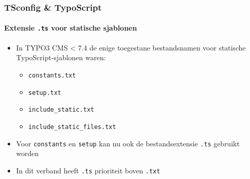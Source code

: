 
\begin{frame}[fragile]
	\frametitle{TSconfig \& TypoScript}
	\framesubtitle{Extensie \texttt{.ts} voor statische sjablonen}

	\begin{itemize}

		\item In TYPO3 CMS < 7.4 de enige toegestane bestandsnamen voor statische TypoScript-sjablonen waren:

			\begin{itemize}
				\item \texttt{constants.txt}
				\item \texttt{setup.txt}
				\item \texttt{include\_static.txt}
				\item \texttt{include\_static\_files.txt}
			\end{itemize}

		\item Voor \texttt{constants} en \texttt{setup} kan nu ook de bestandsextensie \texttt{.ts} gebruikt worden

		\item In dit verband heeft \texttt{.ts} prioriteit boven \texttt{.txt}

	\end{itemize}

\end{frame}


